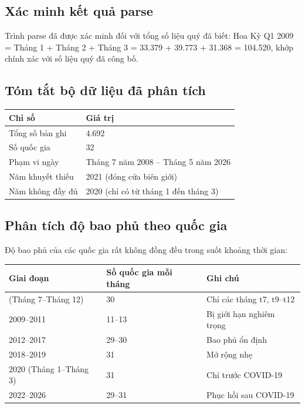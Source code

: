 \documentclass[
]{article}
\begin{document}
\subsection{Xác minh kết quả
parse}\label{xuxe1c-minh-kux1ebft-quux1ea3-parse}

Trình parse đã được xác minh đối với tổng số liệu quý đã biết: Hoa Kỳ Q1
2009 = Tháng 1 + Tháng 2 + Tháng 3 = 33.379 + 39.773 + 31.368 = 104.520,
khớp chính xác với số liệu quý đã công bố.

\subsection{Tóm tắt bộ dữ liệu đã phân
tích}\label{tuxf3m-tux1eaft-bux1ed9-dux1eef-liux1ec7u-ux111uxe3-phuxe2n-tuxedch}

\begin{longtable}[]{@{}ll@{}}
\toprule\noalign{}
Chỉ số & Giá trị \\
\midrule\noalign{}
\endhead
\bottomrule\noalign{}
\endlastfoot
Tổng số bản ghi & 4.692 \\
Số quốc gia & 32 \\
Phạm vi ngày & Tháng 7 năm 2008 -- Tháng 5 năm 2026 \\
Năm khuyết thiếu & 2021 (đóng cửa biên giới) \\
Năm không đầy đủ & 2020 (chỉ có từ tháng 1 đến tháng 3) \\
\end{longtable}

\subsection{Phân tích độ bao phủ theo quốc
gia}\label{phuxe2n-tuxedch-ux111ux1ed9-bao-phux1ee7-theo-quux1ed1c-gia}

Độ bao phủ của các quốc gia rất không đồng đều trong suốt khoảng thời
gian:

\begin{longtable}[]{@{}lll@{}}
\toprule\noalign{}
Giai đoạn & Số quốc gia mỗi tháng & Ghi chú \\
\midrule\noalign{}
\endhead
\bottomrule\noalign{}
\endlastfoot
2008 (Tháng 7--Tháng 12) & 30 & Chỉ các tháng t7, t9--t12 \\
2009--2011 & 11--13 & Bị giới hạn nghiêm trọng \\
2012--2017 & 29--30 & Bao phủ ổn định \\
2018--2019 & 31 & Mở rộng nhẹ \\
2020 (Tháng 1--Tháng 3) & 31 & Chỉ trước COVID-19 \\
2022--2026 & 29--31 & Phục hồi sau COVID-19 \\
\end{longtable}
\end{document}
